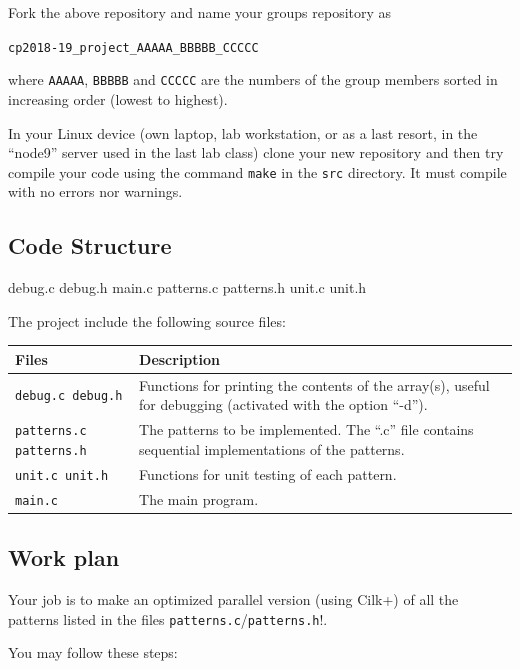 \documentclass[11pt]{article}
\begin{document}
Fork the above repository and name your groups repository as

\verb!cp2018-19_project_AAAAA_BBBBB_CCCCC!

where \verb!AAAAA!,  \verb!BBBBB! and  \verb!CCCCC! are the numbers of the group members sorted in increasing order (lowest to highest).

In your Linux device (own laptop, lab workstation, or as a last resort, in the “node9” server used in the last lab class) clone your new repository and then try compile your code using the command \verb!make! in the \verb!src! directory.  It must compile with no errors nor warnings.


\subsection{Code Structure}

debug.c debug.h main.c patterns.c patterns.h unit.c unit.h

The project include the following source files:

\begin{tabularx}{\linewidth}{lX}
  \toprule
  \textbf{Files} & \textbf{Description}\\
  \midrule
  \texttt{debug.c debug.h}
   & Functions for printing the contents of the array(s), useful for debugging (activated with the option “-d”).\\
  \texttt{patterns.c patterns.h}
  & The patterns to be implemented.  The “.c” file contains sequential implementations of the patterns.\\
  \texttt{unit.c unit.h} 
  & Functions for unit testing of each pattern.\\
  \texttt{main.c} 
  & The main program.\\
  \bottomrule
\end{tabularx}


\subsection{Work plan}

Your job is to make an optimized parallel version (using Cilk+) of all the patterns listed in the files \verb!patterns.c!/\verb!patterns.h!!.

You may follow these steps:
\end{document}
